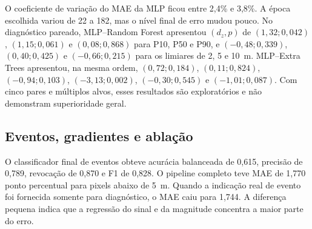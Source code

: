 \begin{table}[htb]
\centering
\caption{MAE no teste fixo e estabilidade da MLP.}
\label{tab:mono-modelos}
\end{table}

O coeficiente de variação do MAE da MLP ficou entre 2,4\% e 3,8\%. A época escolhida variou de 22 a 182, mas o nível final de erro mudou pouco. No diagnóstico pareado, MLP--Random Forest apresentou $(d_z,p)$ de $(1,32;0,042)$, $(1,15;0,061)$ e $(0,08;0,868)$ para P10, P50 e P90, e $(-0,48;0,339)$, $(0,40;0,425)$ e $(-0,66;0,215)$ para os limiares de 2, 5 e 10~m. MLP--Extra Trees apresentou, na mesma ordem, $(0,72;0,184)$, $(0,11;0,824)$, $(-0,94;0,103)$, $(-3,13;0,002)$, $(-0,30;0,545)$ e $(-1,01;0,087)$. Com cinco pares e múltiplos alvos, esses resultados são exploratórios e não demonstram superioridade geral.

\subsection{Eventos, gradientes e ablação}

O classificador final de eventos obteve acurácia balanceada de 0,615, precisão de 0,789, revocação de 0,870 e F1 de 0,828. O pipeline completo teve MAE de 1,770 ponto percentual para pixels abaixo de 5~m. Quando a indicação real de evento foi fornecida somente para diagnóstico, o MAE caiu para 1,744. A diferença pequena indica que a regressão do sinal e da magnitude concentra a maior parte do erro.

